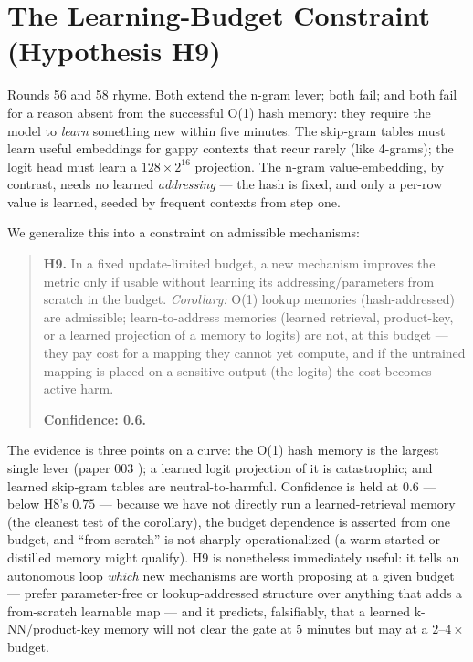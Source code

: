 \documentclass{article}
\begin{document}
\section{The Learning-Budget Constraint (Hypothesis H9)}
\label{sec:h9}

Rounds 56 and 58 rhyme. Both extend the n-gram lever; both fail; and both fail for a reason absent from the successful O(1) hash memory: they require the model to \emph{learn} something new within five minutes. The skip-gram tables must learn useful embeddings for gappy contexts that recur rarely (like 4-grams); the logit head must learn a $128\times2^{16}$ projection. The n-gram value-embedding, by contrast, needs no learned \emph{addressing} --- the hash is fixed, and only a per-row value is learned, seeded by frequent contexts from step one.

We generalize this into a constraint on admissible mechanisms:

\begin{quote}
\textbf{H9.} In a fixed update-limited budget, a new mechanism improves the metric only if usable without learning its addressing/parameters from scratch in the budget. \emph{Corollary:} O(1) lookup memories (hash-addressed) are admissible; learn-to-address memories (learned retrieval, product-key, or a learned projection of a memory to logits) are not, at this budget --- they pay cost for a mapping they cannot yet compute, and if the untrained mapping is placed on a sensitive output (the logits) the cost becomes active harm.

\textbf{Confidence: 0.6.}
\end{quote}

The evidence is three points on a curve: the O(1) hash memory is the largest single lever (paper 003 \cite{ophis2026ngram}); a learned logit projection of it is catastrophic; and learned skip-gram tables are neutral-to-harmful. Confidence is held at $0.6$ --- below H8's $0.75$ --- because we have not directly run a learned-retrieval memory (the cleanest test of the corollary), the budget dependence is asserted from one budget, and ``from scratch'' is not sharply operationalized (a warm-started or distilled memory might qualify). H9 is nonetheless immediately useful: it tells an autonomous loop \emph{which} new mechanisms are worth proposing at a given budget --- prefer parameter-free or lookup-addressed structure over anything that adds a from-scratch learnable map --- and it predicts, falsifiably, that a learned k-NN/product-key memory will not clear the gate at 5 minutes but may at a $2$--$4\times$ budget.
\end{document}
